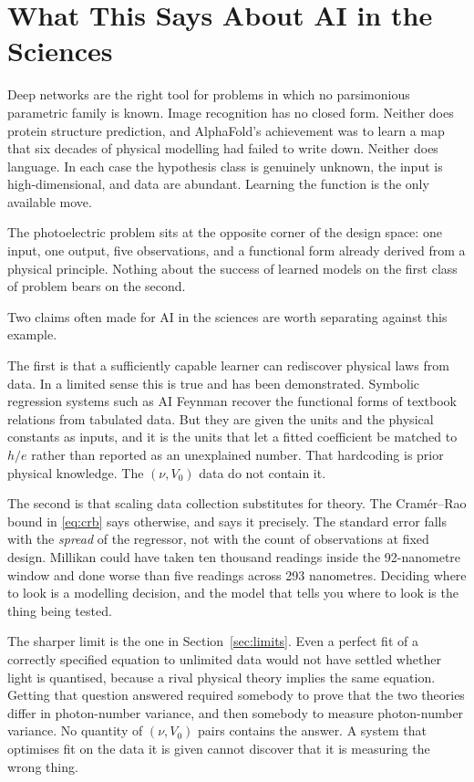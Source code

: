 \documentclass[11pt]{article}
\begin{document}
\section{What This Says About AI in the Sciences}

Deep networks are the right tool for problems in which no parsimonious
parametric family is known.  Image recognition has no closed form.  Neither
does protein structure prediction, and AlphaFold's achievement was to learn a
map that six decades of physical modelling had failed to write down.  Neither
does language.  In each case the hypothesis class is genuinely unknown, the
input is high-dimensional, and data are abundant.  Learning the function is
the only available move.

The photoelectric problem sits at the opposite corner of the design space: one
input, one output, five observations, and a functional form already derived
from a physical principle.  Nothing about the success of learned models on the
first class of problem bears on the second.

Two claims often made for AI in the sciences are worth separating against this
example.

The first is that a sufficiently capable learner can rediscover physical laws
from data.  In a limited sense this is true and has been demonstrated.
Symbolic regression systems such as AI Feynman \citep{Udrescu2020} recover the
functional forms of textbook relations from tabulated data.  But they are
given the units and the physical constants as inputs, and it is the units that
let a fitted coefficient be matched to $h/e$ rather than reported as an
unexplained number.  That hardcoding is prior physical knowledge.  The
$(\nu, V_0)$ data do not contain it.

The second is that scaling data collection substitutes for theory.  The
Cram\'er--Rao bound in \eqref{eq:crb} says otherwise, and says it precisely.
The standard error falls with the \emph{spread} of the regressor, not with the
count of observations at fixed design.  Millikan could have taken ten thousand
readings inside the 92-nanometre window and done worse than five readings
across 293 nanometres.  Deciding where to look is a modelling decision, and
the model that tells you where to look is the thing being tested.

The sharper limit is the one in Section~\ref{sec:limits}.  Even a perfect fit
of a correctly
specified equation to unlimited data would not have settled whether light is
quantised, because a rival physical theory implies the same equation.  Getting
that question answered required somebody to prove that the two theories differ
in photon-number variance, and then somebody to measure photon-number
variance.  No quantity of $(\nu, V_0)$ pairs contains the answer.  A system
that optimises fit on the data it is given cannot discover that it is
measuring the wrong thing.
\end{document}
